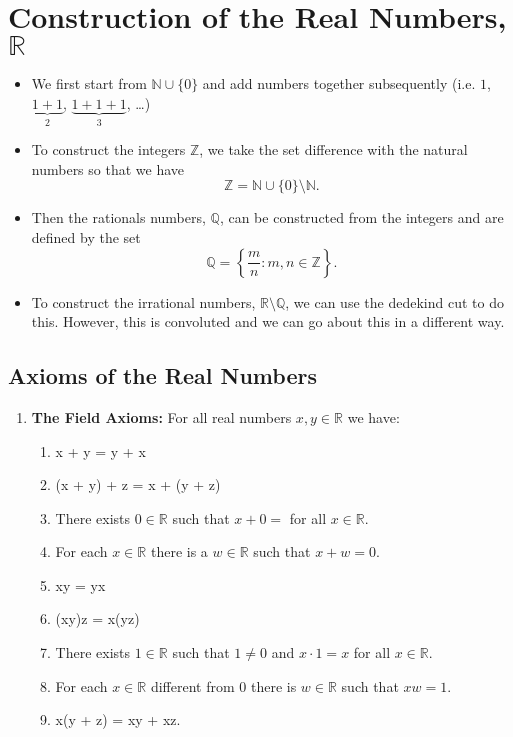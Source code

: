 \documentclass[12pt]{article}
\newcommand{\R}{\mathbb{R}}
\newcommand{\N}{\mathbb{N}}
\newcommand{\Z}{\mathbb{Z}}
\newcommand{\Q}{\mathbb{Q}}
\theoremstyle{definition}
\begin{document}
\section*{Construction of the Real Numbers, \( \R \)}

\begin{itemize}
    \item We first start from \( \N \cup \{ 0\} \) and add numbers together subsequently (i.e.  \( 1 \), \( \underbrace{1 + 1}_{2} \), \( \underbrace{1 + 1 + 1}_{3} \), \ldots)
    \item To construct the integers \( \Z  \), we take the set difference with the natural numbers so that we have 
        \[
            \Z = \N \cup \{ 0 \} \setminus \N.  
        \]
    \item Then the rationals numbers, \( \Q \), can be constructed from the integers and are defined by the set 
        \[
            \Q = \left\{  \frac{m}{n} : m, n \in \Z \right\}.  
        \]
    \item To construct the irrational numbers, \( \R \setminus \Q \), we can use the dedekind cut to do this. However, this is convoluted and we can go about this in a different way.

\end{itemize}

\subsection*{Axioms of the Real Numbers}
\begin{enumerate}[label=\textbf{A}.]
    \item \textbf{The Field Axioms:} For all real numbers \( x, y \in \R \) we have:
    \begin{enumerate}[label=A\arabic*.]
        \item x + y = y + x
        \item (x + y) + z  =  x + (y + z)
        \item There exists \( 0 \in \R \) such that \( x + 0 = \) for all \( x \in \R \). 
        \item For each \( x \in \R \) there is a \( w \in \R \) such that \( x + w = 0 \). 
        \item xy = yx
        \item (xy)z = x(yz)
        \item There exists \( 1 \in \R \) such that \( 1 \neq 0 \) and \( x \cdot 1 = x \) for all \( x \in \R \).
        \item For each \( x \in \R \) different from \( 0 \) there is \( w \in \R \) such that \( xw = 1 \).
        \item x(y + z) = xy + xz.
    \end{enumerate}
\end{enumerate}
\end{document}
